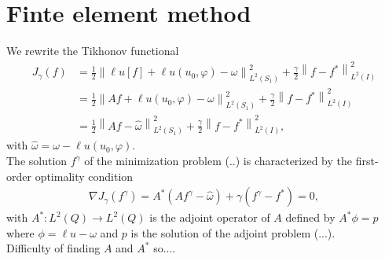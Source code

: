 \documentclass[]{article}
\begin{document}
\section{Finte element method}
We rewrite the Tikhonov functional
\begin{align*}
	J_\gamma(f)&=\frac{1}{2}\left\|\ell u[f]+\ell u(u_0, \varphi)-\omega\right\|^2_{L^2(S_1)}+\frac{\gamma}{2}\left\|f-f^*\right\|^2_{L^2(I)}\\
	&=\frac{1}{2}\left\|Af+\ell u(u_0, \varphi)-\omega\right\|^2_{L^2(S_1)}+\frac{\gamma}{2}\left\|f-f^*\right\|^2_{L^2(I)}\\
	&=\frac{1}{2}\left\|Af-\hat{\omega}\right\|^2_{L^2(S_1)}+\frac{\gamma}{2}\left\|f-f^*\right\|^2_{L^2(I)},
\end{align*}
with $\hat{\omega}=\omega-\ell u(u_0, \varphi)$.
\\
The solution $f^\gamma$ of the minimization problem (..) is characterized by the first-order optimality condition
\begin{align}\label{3.8}
	\nabla J_\gamma(f^\gamma)= A^*(Af^\gamma-\hat{\omega})+\gamma(f^\gamma-f^*)=0,
\end{align}
with $A^*: L^2(Q)\to L^2(Q)$ is the adjoint operator of $A$ defined by $A^*\phi = p$ where $\phi = \ell u - \omega$ and $p$ is the solution of the adjoint problem (...). 
\\
Difficulty of finding $A$ and $A^*$ so....
\end{document}
